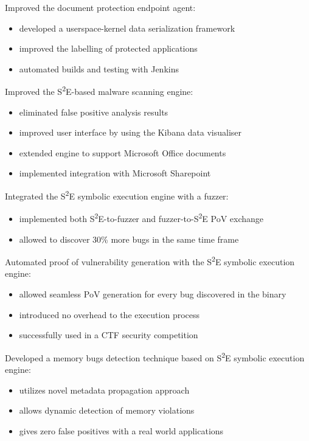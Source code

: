 \documentclass[11pt, a4paper]{moderncv}
\begin{document}
{
  Improved the document protection endpoint agent:
    \begin{itemize}
      \item developed a userspace-kernel data serialization framework
      \item improved the labelling of protected applications
      \item automated builds and testing with Jenkins
    \end{itemize}
  Improved the S\textsuperscript{2}E-based malware scanning engine:
    \begin{itemize}
      \item eliminated false positive analysis results
      \item improved user interface by using the Kibana data visualiser
      \item extended engine to support Microsoft Office documents
      \item implemented integration with Microsoft Sharepoint
    \end{itemize}
  Integrated the S\textsuperscript{2}E symbolic execution engine with a fuzzer:
    \begin{itemize}
      \item implemented both S\textsuperscript{2}E-to-fuzzer and fuzzer-to-S\textsuperscript{2}E PoV exchange
      \item allowed to discover 30\% more bugs in the same time frame
    \end{itemize}
  Automated proof of vulnerability generation with the S\textsuperscript{2}E symbolic execution engine:
    \begin{itemize}
      \item allowed seamless PoV generation for every bug discovered in the binary
      \item introduced no overhead to the execution process
      \item successfully used in a CTF security competition
    \end{itemize}
  Developed a memory bugs detection technique based on S\textsuperscript{2}E symbolic execution engine:
    \begin{itemize}
      \item utilizes novel metadata propagation approach
      \item allows dynamic detection of memory violations
      \item gives zero false positives with a real world applications
    \end{itemize}
}
\end{document}
